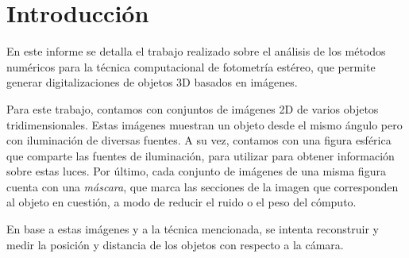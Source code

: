 \section{Introducción}

En este informe se detalla el trabajo realizado sobre el análisis
de los métodos numéricos para la técnica computacional de fotometría estéreo,
que permite generar digitalizaciones de objetos 3D basados en imágenes.

Para este trabajo, contamos con conjuntos de imágenes 2D de varios objetos
tridimensionales. Estas imágenes muestran un objeto desde el mismo ángulo
pero con iluminación de diversas fuentes. A su vez, contamos con una figura
esférica que comparte las fuentes de iluminación, para utilizar para obtener
información sobre estas luces. Por último, cada conjunto de imágenes de una
misma figura cuenta con una \textit{máscara}, que marca las secciones de la
imagen que corresponden al objeto en cuestión, a modo de reducir el ruido
o el peso del cómputo.

En base a estas imágenes y a la técnica mencionada, se intenta reconstruir
y medir la posición y distancia de los objetos con respecto a la cámara.
